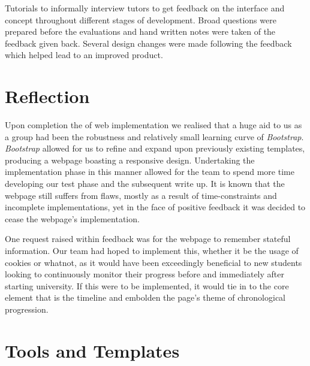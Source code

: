 \documentclass[a4paper, notoc]{tufte-handout}
\begin{document}

Tutorials to informally interview tutors to get feedback on the interface and concept throughout different stages of development. Broad questions were prepared before the evaluations and hand written notes were taken of the feedback given back. Several design changes were made following the feedback which helped lead to an improved product.

\section{Reflection}


Upon completion the of web implementation we realised that a huge aid to us as a group had been the robustness and relatively small learning curve of \textit{Bootstrap}. \textit{Bootstrap} allowed for us to refine and expand upon previously existing templates, producing a webpage boasting a responsive design. Undertaking the implementation phase in this manner allowed for the team to spend more time developing our test phase and the subsequent write up. It is known that the webpage still suffers from flaws, mostly as a result of time-constraints and incomplete implementations, yet in the face of positive feedback it was decided to cease the webpage's implementation.

One request raised within feedback was for the webpage to remember stateful information. Our team had hoped to implement this, whether it be the usage of cookies or whatnot, as it would have been exceedingly beneficial to new students looking to continuously monitor their progress before and immediately after starting university. If this were to be implemented, it would tie in to the core element that is the timeline and embolden the page's theme of chronological progression.


\section{Tools and Templates}
\end{document}
